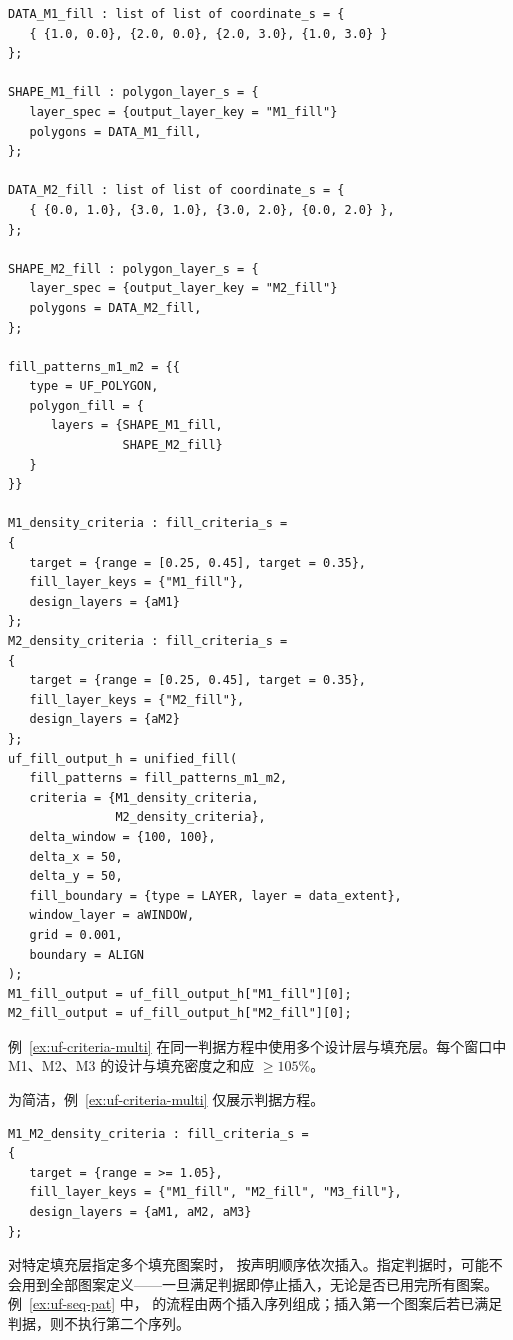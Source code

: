 \begin{lstlisting}[style=pxl,caption={带两个判据方程的填充规范},label={ex:uf-criteria-two}]
DATA_M1_fill : list of list of coordinate_s = {
   { {1.0, 0.0}, {2.0, 0.0}, {2.0, 3.0}, {1.0, 3.0} }
};

SHAPE_M1_fill : polygon_layer_s = {
   layer_spec = {output_layer_key = "M1_fill"}
   polygons = DATA_M1_fill,
};

DATA_M2_fill : list of list of coordinate_s = {
   { {0.0, 1.0}, {3.0, 1.0}, {3.0, 2.0}, {0.0, 2.0} },
};

SHAPE_M2_fill : polygon_layer_s = {
   layer_spec = {output_layer_key = "M2_fill"}
   polygons = DATA_M2_fill,
};

fill_patterns_m1_m2 = {{
   type = UF_POLYGON,
   polygon_fill = {
      layers = {SHAPE_M1_fill,
                SHAPE_M2_fill}
   }
}}

M1_density_criteria : fill_criteria_s =
{
   target = {range = [0.25, 0.45], target = 0.35},
   fill_layer_keys = {"M1_fill"},
   design_layers = {aM1}
};
M2_density_criteria : fill_criteria_s =
{
   target = {range = [0.25, 0.45], target = 0.35},
   fill_layer_keys = {"M2_fill"},
   design_layers = {aM2}
};
uf_fill_output_h = unified_fill(
   fill_patterns = fill_patterns_m1_m2,
   criteria = {M1_density_criteria,
               M2_density_criteria},
   delta_window = {100, 100},
   delta_x = 50,
   delta_y = 50,
   fill_boundary = {type = LAYER, layer = data_extent},
   window_layer = aWINDOW,
   grid = 0.001,
   boundary = ALIGN
);
M1_fill_output = uf_fill_output_h["M1_fill"][0];
M2_fill_output = uf_fill_output_h["M2_fill"][0];
\end{lstlisting}

例~\ref{ex:uf-criteria-multi} 在同一判据方程中使用多个设计层与填充层。每个窗口中 M1、M2、M3 的设计与填充密度之和应 $\geq 105\%$。

\begin{noteBox}
为简洁，例~\ref{ex:uf-criteria-multi} 仅展示判据方程。
\end{noteBox}

\begin{lstlisting}[style=pxl,caption={同一判据方程中含多层的填充规范},label={ex:uf-criteria-multi}]
M1_M2_density_criteria : fill_criteria_s =
{
   target = {range = >= 1.05},
   fill_layer_keys = {"M1_fill", "M2_fill", "M3_fill"},
   design_layers = {aM1, aM2, aM3}
};
\end{lstlisting}

对特定填充层指定多个填充图案时， 按声明顺序依次插入。指定判据时，可能不会用到全部图案定义——一旦满足判据即停止插入，无论是否已用完所有图案。
例~\ref{ex:uf-seq-pat} 中， 的流程由两个插入序列组成；插入第一个图案后若已满足判据，则不执行第二个序列。

